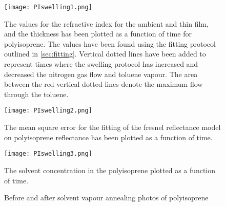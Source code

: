 \documentclass[MasterThesisMain.tex]{subfiles}
\begin{document}
\begin{figure}[H]
\centering
\texttt{[image: PIswelling1.png]}
\caption{The values for the refractive index for the ambient and thin film, and the thickness has been plotted as a function of time for polyisoprene. The values have been found using the fitting protocol outlined in \ref{sec:fitting}. Vertical dotted lines have been added to represent times where the swelling protocol has increased and decreased the nitrogen gas flow and toluene vapour. The area between the red vertical dotted lines denote the maximum flow through the toluene.}
\label{fig:PIswelling1}
\end{figure}

\begin{figure}[H]
\centering
\texttt{[image: PIswelling2.png]}
\caption{The mean square error for the fitting of the fresnel reflectance model on polyisoprene reflectance has been plotted as a function of time.}
\label{fig:PIswelling2}
\end{figure}

\begin{figure}[H]
\centering
\texttt{[image: PIswelling3.png]}
\caption{The solvent concentration in the polyisoprene plotted as a function of time.}
\label{fig:PIswelling3}
\end{figure}

\begin{figure}
\centering     
{}
\caption{Before and after solvent vapour annealing photos of polyisoprene}
\end{figure}
	
\end{document}
